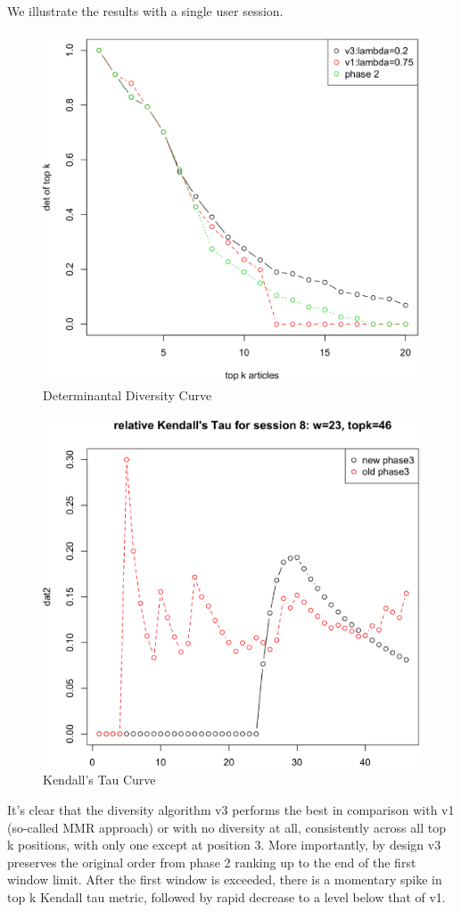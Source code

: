 We illustrate the results with a single user session. 
\begin{figure}[H]
\includegraphics[scale=0.5]{DDcurve.pdf}
\caption{Determinantal Diversity Curve}
\end{figure}

\begin{figure}[H]
\includegraphics[scale=0.5]{KTcurve.pdf}
\caption{Kendall's Tau Curve}
\end{figure}

It's clear that the diversity algorithm v3 performs the best in comparison with v1 (so-called MMR approach) or with no diversity at all, consistently across all top k positions, with only one except at position 3. More importantly, by design v3 preserves the original order from phase 2 ranking up to the end of the first window limit. After the first window is exceeded, there is a momentary spike in top k Kendall tau metric, followed by rapid decrease to a level below that of v1. 


 

